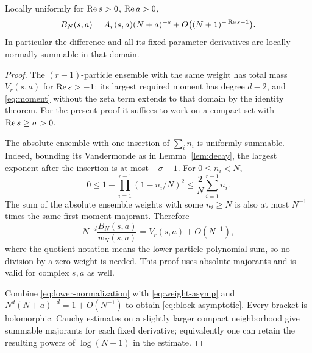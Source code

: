 \begin{lemma}\label{lem:block}
Locally uniformly for $\operatorname{Re} s>0$, $\operatorname{Re} a>0$,
\begin{equation}\label{eq:block-asymptotic}
 B_N(s,a)=A_r(s,a)(N+a)^{-s}
       +O\bigl((N+1)^{-\operatorname{Re} s-1}\bigr).
\end{equation}
In particular the difference and all its fixed parameter derivatives
are locally normally summable in that domain.
\end{lemma}
\begin{proof}
The $(r-1)$-particle ensemble with the same weight has total mass $V_r(s,a)$
for $\operatorname{Re} s>-1$: its largest required moment has degree $d-2$, and
\eqref{eq:moment} without the zeta term extends to that domain by the
identity theorem. For the present proof it suffices to work on a compact
set with $\operatorname{Re} s\ge\sigma>0$.

The absolute ensemble with one insertion of $\sum_i n_i$ is uniformly
summable. Indeed, bounding its Vandermonde as in Lemma~\ref{lem:decay},
the largest exponent after the insertion is at most $-\sigma-1$.
For $0\le n_i<N$,
\[
 0\le1-\prod_{i=1}^{r-1}(1-n_i/N)^2
       \le\frac2N\sum_{i=1}^{r-1}n_i.
\]
The sum of the absolute ensemble weights with some $n_i\ge N$ is also
at most $N^{-1}$ times the same first-moment majorant. Therefore
\begin{equation}\label{eq:lower-normalization}
 N^{-d}\frac{B_N(s,a)}{w_N(s,a)}=V_r(s,a)+O(N^{-1}),
\end{equation}
where the quotient notation means the lower-particle polynomial sum,
so no division by a zero weight is needed. This proof uses absolute
majorants and is valid for complex $s,a$ as well.

Combine \eqref{eq:lower-normalization} with
\eqref{eq:weight-asymp} and
$N^d(N+a)^{-d}=1+O(N^{-1})$ to obtain
\eqref{eq:block-asymptotic}. Every bracket is holomorphic. Cauchy
estimates on a slightly larger compact neighborhood give summable
majorants for each fixed derivative; equivalently one can retain the
resulting powers of $\log(N+1)$ in the estimate.
\end{proof}

